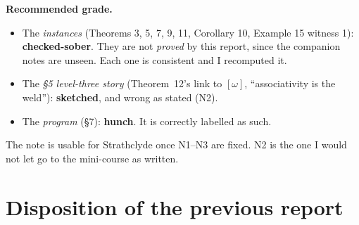 \documentclass[11pt]{article}
\begin{document}
\textbf{Recommended grade.}
\begin{itemize}[leftmargin=1.2em]
\item The \emph{instances} (Theorems 3, 5, 7, 9, 11, Corollary 10, Example 15 witness 1):
\textbf{checked-sober}. They are not \emph{proved} by this report, since the companion notes are
unseen. Each one is consistent and I recomputed it.
\item The \emph{\S5 level-three story} (Theorem~12's link to $[\omega]$, ``associativity is the
weld''): \textbf{sketched}, and wrong as stated (N2).
\item The \emph{program} (\S7): \textbf{hunch}. It is correctly labelled as such.
\end{itemize}
The note is usable for Strathclyde once N1--N3 are fixed. N2 is the one I would not let go to the
mini-course as written.

\section{Disposition of the previous report}
\end{document}
